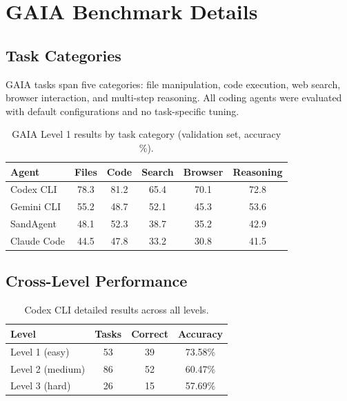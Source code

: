 \section{GAIA Benchmark Details}

\subsection{Task Categories}

GAIA tasks span five categories: file manipulation, code execution, web search, browser interaction, and multi-step reasoning. All coding agents were evaluated with default configurations and no task-specific tuning.

\begin{table}[h]
\caption{GAIA Level 1 results by task category (validation set, accuracy \%).}
\centering
\small
\begin{tabular}{@{}lccccc@{}}
\toprule
\textbf{Agent} & \textbf{Files} & \textbf{Code} & \textbf{Search} & \textbf{Browser} & \textbf{Reasoning} \\
\midrule
Codex CLI   & 78.3 & 81.2 & 65.4 & 70.1 & 72.8 \\
Gemini CLI  & 55.2 & 48.7 & 52.1 & 45.3 & 53.6 \\
SandAgent   & 48.1 & 52.3 & 38.7 & 35.2 & 42.9 \\
Claude Code & 44.5 & 47.8 & 33.2 & 30.8 & 41.5 \\
\bottomrule
\end{tabular}
\end{table}

\subsection{Cross-Level Performance}

\begin{table}[h]
\caption{Codex CLI detailed results across all levels.}
\centering
\small
\begin{tabular}{@{}lccc@{}}
\toprule
\textbf{Level} & \textbf{Tasks} & \textbf{Correct} & \textbf{Accuracy} \\
\midrule
Level 1 (easy)   & 53 & 39 & 73.58\% \\
Level 2 (medium) & 86 & 52 & 60.47\% \\
Level 3 (hard)   & 26 & 15 & 57.69\% \\
\bottomrule
\end{tabular}
\end{table}


